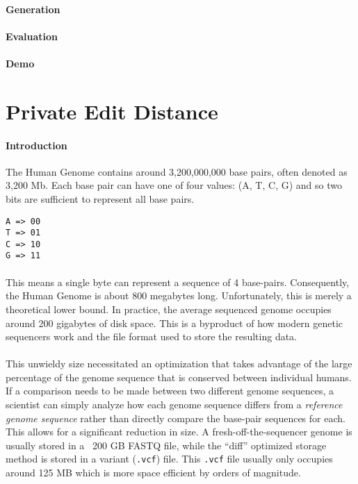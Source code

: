 \paragraph{Generation}

\paragraph{Evaluation}

\paragraph{Demo}

\section{Private Edit Distance}

\paragraph{Introduction}
The Human Genome contains around 3,200,000,000 base pairs, often denoted as 3,200 Mb. Each base pair can have one of four values: (A, T, C, G) and so two bits are sufficient to represent all base pairs.

\begin{verbatim}
A => 00
T => 01
C => 10
G => 11
\end{verbatim}

\paragraph{}
This means a single byte can represent a sequence of 4 base-pairs. Consequently, the Human Genome is about 800 megabytes long. Unfortunately, this is merely a theoretical lower bound. In practice, the average sequenced genome occupies around 200 gigabytes of disk space. This is a byproduct of how modern genetic sequencers work and the file format used to store the resulting data.

\paragraph{}
This unwieldy size necessitated an optimization that takes advantage of the large percentage of the genome sequence that is conserved between individual humans. If a comparison needs to be made between two different genome sequences, a scientist can simply analyze how each genome sequence differs from a \textit{reference genome sequence} rather than directly compare the base-pair sequences for each. This allows for a significant reduction in size. A fresh-off-the-sequencer genome is usually stored in a ~200 GB FASTQ file, while the ``diff'' optimized storage method is stored in a variant (\texttt{.vcf}) file. This \texttt{.vcf} file usually only occupies around 125 MB which is more space efficient by orders of magnitude.

